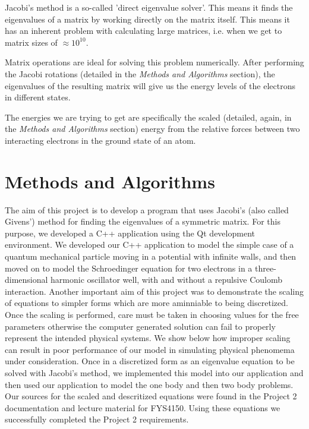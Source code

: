 \documentclass[10pt,showpacs,preprintnumbers,footinbib,amsmath,amssymb,aps,prl,twocolumn,groupedaddress,superscriptaddress,showkeys]{revtex4-1}
\begin{document}
Jacobi's method is a so-called 'direct eigenvalue solver'. This means it finds the eigenvalues of a matrix by working directly on the matrix itself. This means it has an inherent problem with calculating large matrices, i.e. when we get to matrix sizes of $\approx 10^{10}$.

Matrix operations are ideal for solving this problem numerically. After performing the Jacobi rotations (detailed in the \textit{Methods and Algorithms} section), the eigenvalues of the resulting matrix will give us the energy levels of the electrons in different states.

The energies we are trying to get are specifically the scaled (detailed, again, in the \textit{Methods and Algorithms} section) energy from the relative forces between two interacting electrons in the ground state of an atom.

\section{Methods and Algorithms} %


The aim of this project is to develop a program that uses Jacobi's (also called Givens') method for finding the eigenvalues of a symmetric matrix. For this purpose, we developed a C++ application using the Qt development environment. We developed our C++ application to model the simple case of a quantum mechanical particle moving in a potential with infinite walls, and then moved on to model the Schroedinger equation for two electrons in a three-dimensional harmonic oscillator well, with and without a repulsive Coulomb interaction.  Another important aim of this project was to demonstrate the scaling of equations to simpler forms which are more aminniable to being discretized. Once the scaling is performed, care must be taken in choosing values for the free parameters otherwise the computer generated solution can fail to properly represent the intended physical systems. We show below how improper scaling can result in poor performance of our model in simulating physical phenomema under consideration. Once in a discretized form as an eigenvalue equation to be solved with Jacobi's method, we implemented this model into our application and then used our application to model the one body and then two body problems. Our sources for the scaled and descritized equations were found in the Project 2 documentation and lecture material for  FYS4150. Using these equations we successfully completed the Project 2 requirements.
\end{document}
